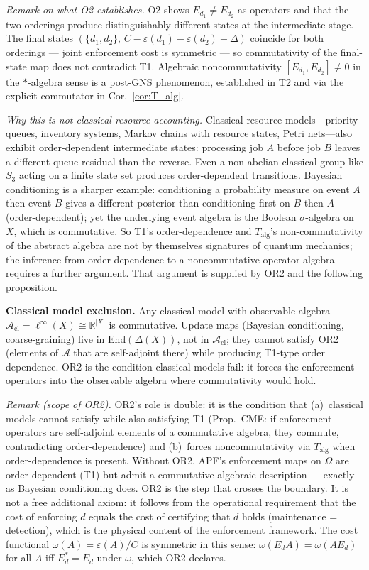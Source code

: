 \documentclass[11pt]{article}
\theoremstyle{remark}
\begin{document}
\smallskip\noindent\textit{Remark on what O2 establishes.}
O2 shows $E_{d_1} \ne E_{d_2}$ as operators and that the two orderings produce distinguishably different states at the intermediate stage.  The final states $(\{d_1,d_2\},\,C{-}\varepsilon(d_1){-}\varepsilon(d_2){-}\Delta)$ coincide for both orderings — joint enforcement cost is symmetric — so commutativity of the final-state map does not contradict T1.  Algebraic noncommutativity $[E_{d_1},E_{d_2}]\ne 0$ in the $*$-algebra sense is a post-GNS phenomenon, established in T2 and via the explicit commutator in Cor.~\ref{cor:T_alg}.


\smallskip\noindent\textit{Why this is not classical resource accounting.}
Classical resource models---priority queues, inventory systems, Markov chains with resource states, Petri nets---also exhibit order-dependent intermediate states: processing job $A$ before job $B$ leaves a different queue residual than the reverse.  Even a non-abelian classical group like $S_3$ acting on a finite state set produces order-dependent transitions.  Bayesian conditioning is a sharper example: conditioning a probability measure on event $A$ then event $B$ gives a different posterior than conditioning first on $B$ then $A$ (order-dependent); yet the underlying event algebra is the Boolean $\sigma$-algebra on $X$, which is commutative.  So T1's order-dependence and $T_{\mathrm{alg}}$'s non-commutativity of the abstract algebra are not by themselves signatures of quantum mechanics; the inference from order-dependence to a noncommutative operator algebra requires a further argument.  That argument is supplied by OR2 and the following proposition.

\smallskip\noindent\textbf{Classical model exclusion.}  Any classical model with observable algebra $\mathcal{A}_{\mathrm{cl}} = \ell^\infty(X) \cong \mathbb{R}^{|X|}$ is commutative.  Update maps (Bayesian conditioning, coarse-graining) live in $\mathrm{End}(\Delta(X))$, not in $\mathcal{A}_{\mathrm{cl}}$; they cannot satisfy OR2 (elements of $\mathcal{A}$ that are self-adjoint there) while producing T1-type order dependence.  OR2 is the condition classical models fail: it forces the enforcement operators into the observable algebra where commutativity would hold.


\smallskip\noindent\textit{Remark (scope of OR2).}  OR2's role is double: it is the condition that (a)~classical models cannot satisfy while also satisfying T1 (Prop.~CME: if enforcement operators are self-adjoint elements of a commutative algebra, they commute, contradicting order-dependence) and (b)~forces noncommutativity via $T_{\mathrm{alg}}$ when order-dependence is present.  Without OR2, APF's enforcement maps on $\Omega$ are order-dependent (T1) but admit a commutative algebraic description --- exactly as Bayesian conditioning does.  OR2 is the step that crosses the boundary.  It is not a free additional axiom: it follows from the operational requirement that the cost of enforcing $d$ equals the cost of certifying that $d$ holds (maintenance = detection), which is the physical content of the enforcement framework.  The cost functional $\omega(A) = \varepsilon(A)/C$ is symmetric in this sense: $\omega(E_d A) = \omega(A E_d)$ for all $A$ iff $E_d^* = E_d$ under $\omega$, which OR2 declares.
\end{document}
